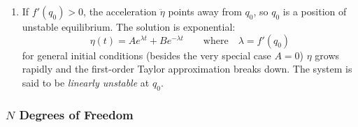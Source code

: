\documentclass[11pt, a4paper]{article}
\begin{document}
\begin{itemize}
\begin{enumerate}
		\item If $ f'(q_0) > 0$, the acceleration $ \ddot{\eta} $ points away from $ q_0 $, so $ q_0 $ is a position of unstable equilibrium. The solution is exponential:
		\begin{equation*}
			\eta(t) = A e^{\lambda t} +  B e^{- \lambda t}  \qquad \text{where} \quad  \lambda = f'(q_0)
		\end{equation*}
		for general initial conditions (besides the very special case $ A = 0 $) $ \eta $ grows rapidly and the first-order Taylor approximation breaks down. The system is said to be \textit{linearly unstable} at $ q_{0} $.
	\end{enumerate}

\end{itemize}

\subsubsection{$ N $ Degrees of Freedom}
\end{document}
